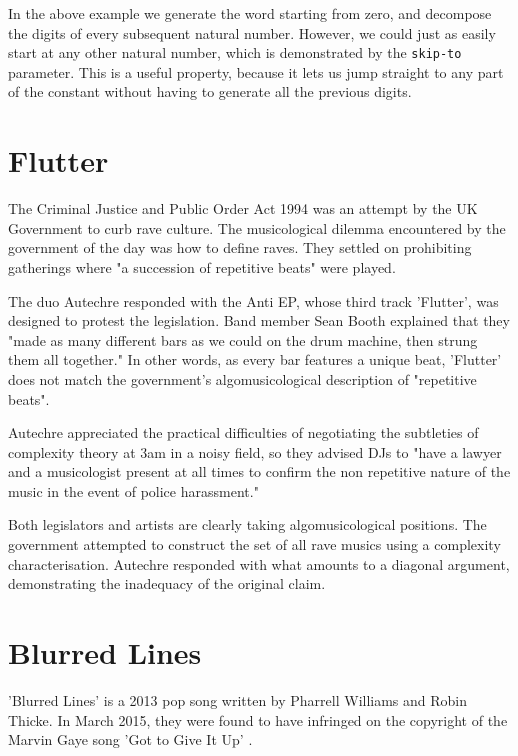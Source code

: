 \documentclass[numbers, preprint]{sigplanconf}
\begin{document}
In the above example we generate the word starting from zero, and decompose the digits of
every subsequent natural number. However, we could just as easily start at any other natural number, which is demonstrated
by the \verb|skip-to| parameter. This is a useful property, because it lets us jump straight to any part of the constant
without having to generate all the previous digits.

\section{Flutter}

The Criminal Justice and Public Order Act 1994 was an attempt by the UK Government to curb rave culture. The musicological
dilemma encountered by the government of the day was how to define raves. They settled on prohibiting gatherings where
"a succession of repetitive beats" were played\cite{Joseph Gallivan on pop}.

The duo Autechre responded with the Anti EP\cite{Anti EP}, whose third track 'Flutter', was designed to protest the legislation.
Band member
Sean Booth explained that they "made as many different bars as we could on the drum machine, then strung them all together."
\cite{Joseph Gallivan on pop}
In other words, as every bar features a unique beat, 'Flutter' does not match the government's algomusicological description
of "repetitive beats".

Autechre appreciated the practical difficulties of negotiating the subtleties of complexity theory at 3am in a noisy field,
so they advised DJs to "have a lawyer and a musicologist present at all times to confirm the non repetitive nature of the
music in the event of police harassment."\cite{Joseph Gallivan on pop}

Both legislators and artists are clearly taking algomusicological positions. The government attempted to construct the set
of all rave musics using a complexity characterisation. Autechre responded with what amounts to a diagonal argument, demonstrating
the inadequacy of the original claim.

\section{Blurred Lines}

'Blurred Lines' is a 2013 pop song written by Pharrell Williams and Robin Thicke\cite{Blurred Lines}. In March 2015,
they were found to have infringed on the copyright of the Marvin Gaye song 'Got to Give It Up'\cite{Got to Give It Up}
\cite{USA Today}.
\end{document}
